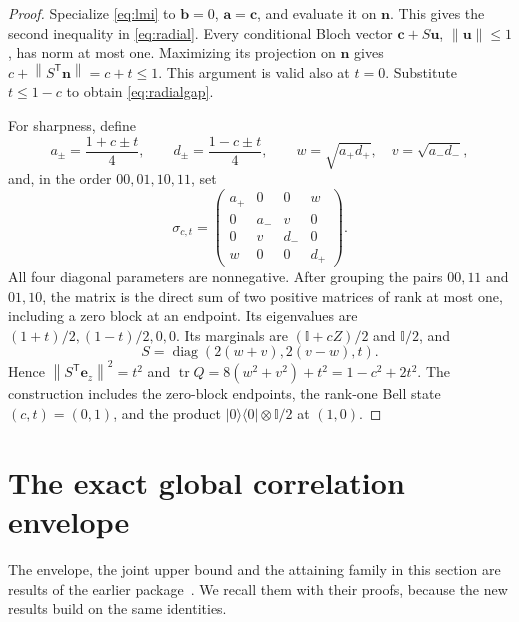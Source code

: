 \documentclass[11pt,a4paper]{article}
\theoremstyle{remark}\newtheorem{remark}[theorem]{Remark}
\newcommand{\tr}{\operatorname{tr}}
\newcommand{\Id}{\mathbb I}
\newcommand{\norm}[1]{\left\lVert#1\right\rVert}
\renewcommand{\aa}{\mathbf a}\newcommand{\bb}{\mathbf b}
\newcommand{\cc}{\mathbf c}\newcommand{\nn}{\mathbf n}
\begin{document}
\begin{proof}
Specialize \eqref{eq:lmi} to $\bb=0$, $\aa=\cc$, and evaluate it on $\nn$.
This gives the second inequality in \eqref{eq:radial}.
Every conditional Bloch vector $\cc+S\mathbf u$, $\norm{\mathbf u}\leq1$,
has norm at most one. Maximizing its projection on $\nn$ gives
$c+\norm{S^{\mathsf T}\nn}=c+t\leq1$. This argument is valid also at $t=0$.
Substitute $t\leq1-c$ to obtain \eqref{eq:radialgap}.

For sharpness, define
\[
a_\pm=\frac{1+c\pm t}{4},\qquad d_\pm=\frac{1-c\pm t}{4},\qquad
w=\sqrt{a_+d_+},\quad v=\sqrt{a_-d_-},
\]
and, in the order $00,01,10,11$, set
\begin{equation}\label{eq:radialwitness}
\sigma_{c,t}=\begin{pmatrix}
a_+&0&0&w\\0&a_-&v&0\\0&v&d_-&0\\w&0&0&d_+
\end{pmatrix}.
\end{equation}
All four diagonal parameters are nonnegative. After grouping the pairs
$00,11$ and $01,10$, the matrix is the direct sum of two positive matrices of
rank at most one, including a zero block at an endpoint. Its eigenvalues are
$(1+t)/2,(1-t)/2,0,0$.
Its marginals are $(\Id+cZ)/2$ and $\Id/2$, and
\[
S=\operatorname{diag}(2(w+v),2(v-w),t).
\]
Hence $\norm{S^{\mathsf T}\mathbf e_z}^2=t^2$ and
$\tr Q=8(w^2+v^2)+t^2=1-c^2+2t^2$. The construction includes the zero-block
endpoints, the rank-one Bell state $(c,t)=(0,1)$, and the product
$|0\rangle\langle0|\otimes\Id/2$ at $(1,0)$.
\end{proof}

\section{The exact global correlation envelope}\label{sec:global}
The envelope, the joint upper bound and the attaining family in this
section are results of the earlier package~\cite{earlier}. We recall them
with their proofs, because the new results build on the same identities.
\end{document}

